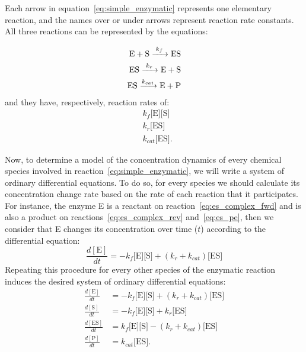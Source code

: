 Each arrow in equation~\ref{eq:simple_enzymatic} represents one 
elementary reaction, and the names over or under arrows represent 
reaction rate constants. All three reactions can be represented by the
equations:

\begin{subequations}
\begin{align}
\ce{
    E + S ->[\ce{$k_f$}] ES 
} \label{eq:es_complex_fwd} \\
\ce{
    ES ->[$k_r$] E + S
} \label{eq:es_complex_rev} \\
\ce{
    ES ->[$k_{cat}$] E + P
} \label{eq:es_pe} 
\end{align}
\end{subequations}
and they have, respectively, reaction rates of:
\begin{equation*}
\begin{aligned}
    & k_f\text{[E][S]} \\
    & k_r\text{[ES]} \\
    & k_{cat}\text{[ES]}.
\end{aligned}
\end{equation*}

Now, to determine a model of the concentration dynamics of every 
chemical species involved in reaction~\ref{eq:simple_enzymatic}, we will
write a system of ordinary differential equations. To do so, for every 
species we should calculate its concentration change rate based on the 
rate of each reaction that it participates. For instance, the enzyme E is a 
reactant on reaction~\ref{eq:es_complex_fwd} and is also a product on 
reactions~\ref{eq:es_complex_rev} and~\ref{eq:es_pe}, then we consider 
that E changes its concentration over time ($t$) according to the 
differential equation:
\begin{equation}
    \frac{d[\text{E}]}{dt} = -k_f\text{[E][S]} + (k_r + k_{cat}) \text{[ES]}
\end{equation} 
Repeating this procedure for every other species of the enzymatic 
reaction induces the desired system of ordinary differential equations:
\begin{subequations}
    \label{eq:full_system}
    \begin{align}
        \frac{d[\text{E}]}{dt} & =  
            -k_f\text{[E][S]} + (k_r + k_{cat}) \text{[ES]} 
            \label{eq:dEdt} \\
        \frac{d[\text{S}]}{dt}  & = 
            -k_f\text{[E][S]} + k_r\text{[ES]} 
            \label{eq:dSdt} \\
        \frac{d[\text{ES}]}{dt} & =  
            k_f\text{[E][S]} - (k_r + k_{cat}) \text{[ES]} 
            \label{eq:dESdt} \\
        \frac{d[\text{P}]}{dt} & = k_{cat}\text{[ES]} \label{eq:dPdt}.
    \end{align}
\end{subequations}

